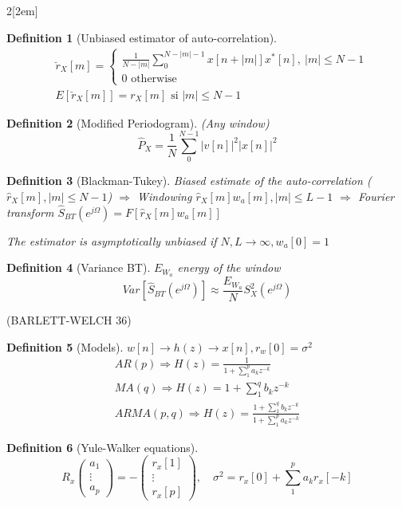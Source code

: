 \documentclass{myclass}
\newtheorem*{definition}{Definition}
\begin{document}
\begin{multicols}{2}[\columnsep2em]
\begin{definition}[Unbiased estimator of auto-correlation]
\begin{align*}
  &\breve{r}_X[m]= \begin{cases}
    \frac{1}{N-|m|}\sum_0^{N-|m|-1}x[n+|m|]x^*[n],\ |m|\le N-1\\
	0 \text{ otherwise}
  \end{cases}\\
  &E[\breve{r}_X[m]]=r_X[m] \text{ si } |m|\le N-1
\end{align*}
\end{definition}

\begin{definition}[Modified Periodogram] (Any window)
\[
  \hat{P}_X=\frac{1}{N}\sum_{0}^{N-1}|v[n]|^2|x[n]|^2
\] 
\end{definition}

\begin{definition}[Blackman-Tukey]
Biased estimate of the auto-correlation ($\hat{r}_X[m], |m|\le N-1$) $\Rightarrow$ Windowing $\hat{r}_X[m]w_a[m], |m|\le L-1$ $\Rightarrow$ Fourier transform  $\hat{S}_{BT}(e^{j\Omega})=F[\hat{r}_X[m]w_a[m]]$ 

The estimator is asymptotically unbiased if $N, L\to \infty , w_a[0]=1$
\end{definition}

\begin{definition}[Variance BT] $E_{W_a}$ energy of the window
\[
Var[\hat{S}_{BT}(e^{j\Omega})] \approx \frac{E_{W_a}}{N}S^2_X(e^{j\Omega})
\] 
\end{definition}

(BARLETT-WELCH 36)
\begin{definition}[Models] $w[n] \rightarrow \boxed{h(z)} \rightarrow x[n], r_w[0]=\sigma ^2$
\begin{align*}
  AR(p) \Rightarrow H(z)=\frac{1}{1+\sum_{1}^{p}a_kz^{-k}}\\
  MA(q) \Rightarrow H(z) = 1+\sum_1^q b_kz^{-k}\\
  ARMA(p,q) \Rightarrow H(z) = \frac{1+\sum_1^q b_kz^{-k}}{1+\sum _1^pa_kz^{-k}}
\end{align*}
\end{definition}

\begin{definition}[Yule-Walker equations]
\[
R_x  \begin{pmatrix} a_1 \\ \vdots \\ a_p \end{pmatrix} = - \begin{pmatrix} r_x[1] \\ \vdots \\ r_x[p] \end{pmatrix} , \quad \sigma ^2 = r_x[0]+\sum_1^pa_kr_x[-k]
\] 
\end{definition}



\end{multicols}
\end{document}
